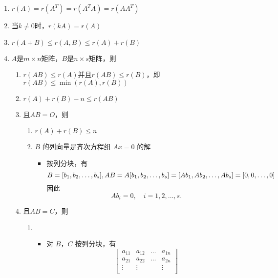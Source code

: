 \documentclass[a4paper,12pt]{article}
\begin{document}
    \begin{enumerate}
        \item $r(A) = r(A^T) = r(A^{T}A) = r(AA^{T})$
        \item 当$k \neq 0$时，$r(kA) = r(A)$
        \item $r(A + B) \le r(A, B) \le r(A) + r(B)$
        \item $A$是$m \times n$矩阵，$B$是$n \times s$矩阵，则
        \begin{enumerate}
            \item $r(AB) \le r(A) \text{并且} r(AB) \le r(B)$，即 $r(AB) \le \min(r(A), r(B))$
            \item $r(A) + r(B) - n \le r(AB)$
            \item 且$AB = O$，则
            \begin{enumerate}
                \item $r(A) + r(B) \le n$
                \item $B$ 的列向量是齐次方程组 $Ax = 0$ 的解
                \begin{itemize}
                    \item 按列分块，有
                    \[
                        B = [b_1, b_2, \dots, b_s], \\
                        AB = A[b_1, b_2, \dots, b_s] = [Ab_1, Ab_2, \dots, Ab_s] = [0, 0, \dots, 0]
                    \]
                    因此
                    \[
                        Ab_i = 0, \quad i = 1, 2, \dots, s.
                    \]
                \end{itemize}
            \end{enumerate}
            \item 且$AB = C$，则
            \begin{enumerate}
                \item {\color[rgb]{0.2, 0.6, 0.3}{矩阵$C(AB)$的行向量$\alpha_1, \alpha_2, \dots, \alpha_n$可由$B$的行向量$\beta_1, \beta_2, \dots, \beta_n$线性表出}}
                \begin{itemize}
                    \item 对 $B$，$C$ 按列分块，有
                    \[
                        \begin{bmatrix}
                            a_{11} & a_{12} & \dots & a_{1n} \\
                            a_{21} & a_{22} & \dots & a_{2n} \\
                            \vdots & \vdots &       & \vdots \\

\end{bmatrix}\]
\end{itemize}
\end{enumerate}
\end{enumerate}
\end{enumerate}
\end{document}
